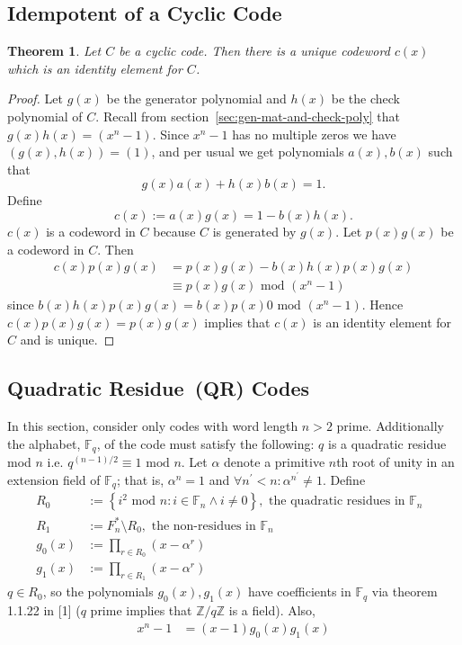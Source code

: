 \documentclass{article}
\renewcommand{\tt}[1]{\text{ #1 }}
\newcommand{\Z}{\mathbb{Z}}
\newcommand{\F}{\mathbb{F}}
\renewcommand{\mod}{\text{ mod }}
\renewcommand{\=}{\equiv}
\newcommand{\p}{^\prime}
\newcommand{\set}[1]{\left\{ #1 \right\}}
\theoremstyle{plain}
\newtheorem{thm}{Theorem}[subsection]
\theoremstyle{definition}
\begin{document}
\subsection{Idempotent of a Cyclic Code}

\begin{thm}
Let $C$ be a cyclic code.
Then there is a unique codeword $c(x)$ which is an identity element for $C$.
\end{thm}
\begin{proof}
Let $g(x)$ be the generator polynomial and $h(x)$ be the check polynomial of $C$.
Recall from section~\ref{sec:gen-mat-and-check-poly} that $g(x) h(x) = (x^n - 1)$.
Since $x^n - 1$ has no multiple zeros we have $(g(x), h(x)) = (1)$, and per usual we get
polynomials $a(x), b(x)$ such that
$$ g(x) a(x) + h(x) b(x) = 1. $$
Define
$$ c(x) := a(x) g(x) = 1 - b(x) h(x). $$
$c(x)$ is a codeword in $C$ because $C$ is generated by $g(x)$.
Let $p(x) g(x)$ be a codeword in $C$.
Then
\begin{align*}
c(x) p(x) g(x)
&= p(x) g(x) - b(x) h(x) p(x) g(x) \\
&\= p(x) g(x) \mod (x^n - 1)
\end{align*}
since $b(x) h(x) p(x) g(x) = b(x) p(x) 0 \mod (x^n - 1)$.
Hence $c(x) p(x) g(x) = p(x) g(x)$ implies that $c(x)$ is an identity element for $C$ and is unique.


\end{proof}

\subsection{Quadratic Residue (QR) Codes}

In this section, consider only codes with word length $n > 2$ prime.
Additionally the alphabet, $\F_q$, of the code must satisfy the following: $q$ is a quadratic residue mod $n$ i.e. $q^{(n-1)/2} \= 1 \mod n$.
Let $\alpha$ denote a primitive $n$th root of unity in an extension field of $\F_q$; that is, $\alpha^n = 1$ and $\forall n\p < n: \alpha^{n\p} \neq 1$.
Define
\begin{align}
  R_0 &:= \set{ i^2 \mod n : i \in \F_n \land i \neq 0 }, \tt{the quadratic residues in $\F_n$} \\
  R_1 &:= F_n^* \setminus R_0, \tt{the non-residues in $\F_n$} \\
  g_0(x) &:= \prod_{r \in R_0} (x - \alpha^r) \\
  g_1(x) &:= \prod_{r \in R_1} (x - \alpha^r)
\end{align}
$q \in R_0$, so the polynomials $g_0(x), g_1(x)$ have coefficients in $\F_q$ via theorem 1.1.22 in [1] ($q$ prime implies that $\Z/q\Z$ is a field).
Also,
\begin{align}
  x^n - 1 &= (x-1) g_0(x) g_1(x)
\end{align}
\end{document}
